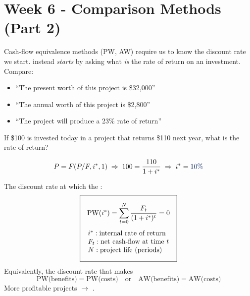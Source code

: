 
\section{Week 6 - Comparison Methods (Part 2)}


Cash-flow equivalence methods (PW, AW) require us to know the discount rate
 we start.  instead \emph{starts}
by asking what \emph{is} the rate of return on an investment. Compare:
\begin{itemize}
    \item ``The present worth of this project is \$32,000''
    \item ``The annual worth of this project is \$2,800''
    \item ``The project will produce a 23\% rate of return''
\end{itemize}

\begin{example}
    If \$100 is invested today in a project that returns \$110 next year,
    what is the rate of return?
    \begin{center}
    \end{center}
    \[P = F(P/F,i^*,1) \;\Rightarrow\; 100 = \frac{110}{1+i^*} \;\Rightarrow\; i^* = \db{10\%}\]
\end{example}

\begin{definition}
    The discount rate at which the :
    \[\boxed{\begin{gathered}
        \text{PW}(i^*) = \sum_{t=0}^{N} \frac{F_t}{(1+i^*)^t} = 0\\[4pt]
        \begin{array}{@{}l@{}}
            i^*: \text{internal rate of return}\\
            F_t: \text{net cash-flow at time } t\\
            N: \text{project life (periods)}
        \end{array}
    \end{gathered}}\]
    Equivalently, the discount rate that makes
    \[\text{PW(benefits)} = \text{PW(costs)} \quad\text{or}\quad \text{AW(benefits)} = \text{AW(costs)}\]
    More profitable projects $\to$ .
\end{definition}

